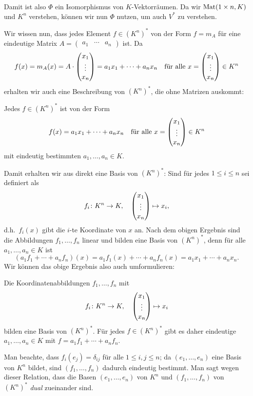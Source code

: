 \documentclass[a4paper,10pt]{article}
\begin{document}
Damit ist also $\Phi$ ein Isomorphismus von $K$-Vektorräumen. Da wir $\mathrm{Mat}(1 \times n, K)$ und $K^n$ verstehen, können wir nun $\Phi$ nutzen, um auch $V^*$ zu verstehen.

Wir wissen nun, dass jedes Element $f \in (K^n)^*$ von der Form $f = m_A$ für eine eindeutige Matrix $A = \begin{pmatrix} a_1 & \cdots & a_n \end{pmatrix}$ ist. Da
\[
 f(x)
 = m_A(x)
 = A \cdot \begin{pmatrix} x_1 \\ \vdots \\ x_n \end{pmatrix}
 = a_1 x_1 + \dotsb + a_n x_n
 \quad
 \text{für alle $x = \begin{pmatrix} x_1 \\ \vdots \\ x_n \end{pmatrix} \in K^n$}
\]
erhalten wir auch eine Beschreibung von $(K^n)^*$, die ohne Matrizen auskommt:


\begin{shaded}
 Jedes $f \in (K^n)^*$ ist von der Form
 \[
  f(x) = a_1 x_1 + \dotsb + a_n x_n
  \quad
  \text{für alle $x = \begin{pmatrix} x_1 \\ \vdots \\ x_n \end{pmatrix} \in K^n$}
 \]
 mit eindeutig bestimmten $a_1, \dotsc, a_n \in K$.
\end{shaded}

Damit erhalten wir aus direkt eine Basis von $(K^n)^*$: Sind für jedes $1 \leq i \leq n$ sei definiert als
\[
 f_i \colon K^n \to K, \quad \begin{pmatrix} x_1 \\ \vdots \\ x_n \end{pmatrix} \mapsto x_i,
\]
d.h.\ $f_i(x)$ gibt die $i$-te Koordinate von $x$ an. Nach dem obigen Ergebnis sind die Abbildungen $f_1, \dotsc, f_n$ linear und bilden eine Basis von $(K^n)^*$, denn für alle $a_1, \dotsc, a_n \in K$ ist
\[
 (a_1 f_1 + \dotsb + a_n f_n)(x)
 = a_1 f_1(x) + \dotsb + a_n f_n(x)
 = a_1 x_1 + \dotsb + a_n x_n.
\]
Wir können das obige Ergebnis also auch umformulieren:

\begin{shaded}
 Die Koordinatenabbildungen $f_1, \dotsc, f_n$ mit
 \[
  f_i \colon K^n \to K, \quad \begin{pmatrix} x_1 \\ \vdots \\ x_n \end{pmatrix} \mapsto x_i
 \]
 bilden eine Basis von $(K^n)^*$. Für jedes $f \in (K^n)^*$ gibt es daher eindeutige $a_1, \dotsc, a_n \in K$ mit $f = a_1 f_1 + \dotsb + a_n f_n$.
\end{shaded}

Man beachte, dass $f_i(e_j) = \delta_{ij}$ für alle $1 \leq i,j \leq n$; da $(e_1, \dotsc, e_n)$ eine Basis von $K^n$ bildet, sind $(f_1, \dotsc, f_n)$ dadurch eindeutig bestimmt. Man sagt wegen dieser Relation, dass die Basen $(e_1, \dotsc, e_n)$ von $K^n$ und $(f_1, \dotsc, f_n)$ von $(K^n)^*$ \emph{dual} zueinander sind.
\end{document}
